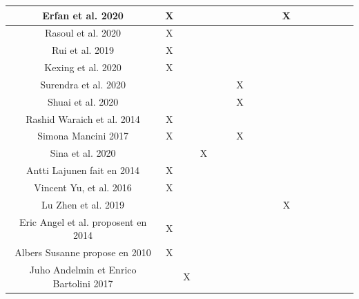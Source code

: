 \begin{center}
\begin{supertabular}{|*{17}{c|}}
		Erfan et al. 2020 &X & & & & & & & & &X & & & & & &\\\hline
		Rasoul et al. 2020&X & & & & & & & & & & & & & & &\\\hline
		Rui et al. 2019&X & & & & & & & & & & & & & & &\\\hline
		Kexing et al.  2020&X & & & & & & & & & & & & & & &\\\hline
		Surendra et al. 2020& & & & & &X & & & & & & & & & &\\\hline
		Shuai et al. 2020 & & & & & & X& & & & & & & & & &\\\hline
		Rashid Waraich et al. 2014 & X& & & & & & & & & & & & & & &\\ \hline
		Simona Mancini 2017&X & & & & & X& & & & & & & & & &\\ \hline
		Sina et al. 2020 & & &X & & & & & & & & & & & & &\\ \hline
		Antti Lajunen fait en 2014 & X& & & & & & & & & & & & & & &\\ \hline
		Vincent Yu, et al. 2016&X & & & & & & & & & & & & & & &\\ \hline
		Lu Zhen et al. 2019 & & & & & & & & & & X& & & & & &\\ \hline
		Eric Angel et al. proposent en 2014 & X& & & & & & & & & & & & & & &\\ \hline
		Albers Susanne propose en 2010 &X & & & & & & & & & & & & & & &\\ \hline
		Juho Andelmin et Enrico Bartolini  2017 & &X & & & & & & & & & & & & & &\\ \hline
	\end{supertabular}
\end{center}

